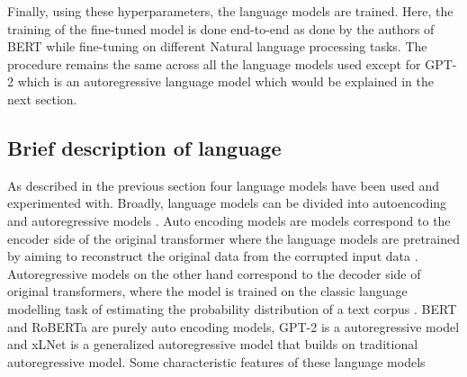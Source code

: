 \begin{table}[h!]
\caption{Hyperparameter search results for language models}
\label{tab:search_results}
\end{table}

Finally, using these hyperparameters, the language models are trained. Here, the training of the fine-tuned model is done end-to-end as done by the authors of BERT \cite{devlin2018bert} while fine-tuning on different Natural language processing tasks. The procedure remains the same across all the language models used except for GPT-2 which is an autoregressive language model which would be explained in the next section.

\subsection{Brief description of language}
As described in the previous section four language models have been used and experimented with. Broadly, language models can be divided into autoencoding and autoregressive models \cite{yang2019xlnet}. Auto encoding models are models correspond to the encoder side of the original transformer \cite{vaswani2017attention} where the language models are pretrained by aiming to reconstruct the original data from the corrupted input data \cite{yang2019xlnet}. Autoregressive models on the other hand correspond to the decoder side of original transformers, where the model is trained on the classic language modelling task of estimating the probability distribution of a text corpus \cite{yang2019xlnet}. BERT and RoBERTa are purely auto encoding models, GPT-2 is a autoregressive model and xLNet is a generalized autoregressive model that builds on traditional autoregressive model. Some characteristic features of these language models  


